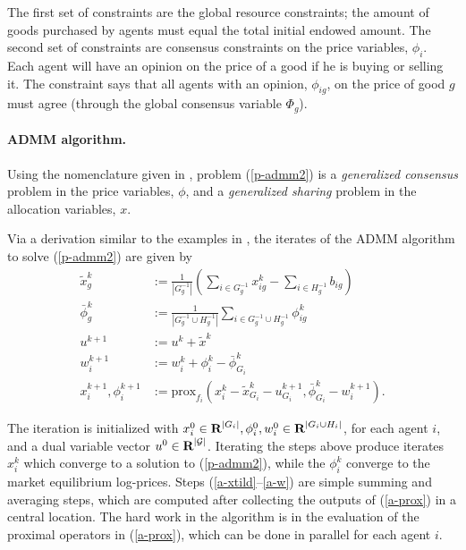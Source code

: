 \documentclass[12pt]{article}
\begin{document}
The first set of constraints are the global resource constraints; the amount of
goods purchased by agents must equal the total initial endowed amount. The
second set of constraints are consensus constraints on the price variables,
$\phi_i$. Each agent will have an opinion on the price of a good if he is
buying or selling it. The constraint says that all agents with an opinion,
$\phi_{ig}$, on the price of good $g$ must agree (through the global
consensus variable $\Phi_g$).


\paragraph{ADMM algorithm.}

Using the nomenclature given in \cite{boyd2011distributed}, problem
(\ref{p-admm2}) is a \emph{generalized consensus} problem in the price variables,
$\phi$, and a \emph{generalized sharing} problem in the allocation variables, $x$.

Via a derivation similar to the examples in \cite{boyd2011distributed},
the iterates of the ADMM algorithm to solve (\ref{p-admm2}) are given by
\begin{align}
\label{a-xtild}
\tilde{x}^k_g &:= \frac{1}{|G^{-1}_g|} \left( \sum_{i \in G^{-1}_g} x^k_{ig} - \sum_{i \in H^{-1}_g} b_{ig}\right)\\
\label{a-phibar}
\bar{\phi}^k_g &:= \frac{1}{ |G^{-1}_g \cup H^{-1}_g| } \sum_{i \in G^{-1}_g \cup H^{-1}_g}\phi^k_{ig}\\
\label{a-u}
u^{k+1} &:= u^k + \tilde{x}^k\\
\label{a-w}
w_i^{k+1} &:= w_i^k + \phi^k_i - \bar{\phi}^k_{G_i}\\
\label{a-prox}
x_i^{k+1}, \phi_i^{k+1} &:= \mbox{prox}_{f_i}(x_i^k - \tilde{x}^k_{G_i} - u^{k+1}_{G_i},
\bar{\phi}^k_{G_i} - w_i^{k+1}).
\end{align}

The iteration is initialized with $x^0_i \in {\mbox{\bf R}}^{|G_i|}, \phi^0_i, w^0_i
\in {\mbox{\bf R}}^{|G_i \cup H_i|}$, for each agent $i$, and a dual variable vector
$u^0 \in {\mbox{\bf R}}^{|\mathcal{G}|}$. Iterating the steps above produce iterates
$x^k_i$ which converge to a solution to (\ref{p-admm2}), while the $\phi^k_i$
converge to the market equilibrium log-prices. Steps (\ref{a-xtild}--\ref{a-w})
are simple summing and averaging steps, which are computed after collecting the
outputs of (\ref{a-prox}) in a central location. The hard work in the algorithm
is in the evaluation of the proximal operators in (\ref{a-prox}), which can be
done in parallel for each agent $i$.
\end{document}
